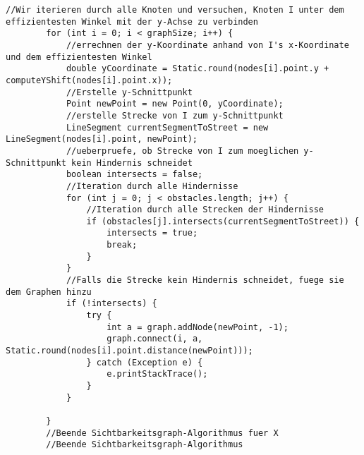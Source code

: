 \documentclass[a4paper,10pt,ngerman]{scrartcl}
\begin{document}
\begin{lstlisting}[frame=single]
        //Wir iterieren durch alle Knoten und versuchen, Knoten I unter dem effizientesten Winkel mit der y-Achse zu verbinden
        for (int i = 0; i < graphSize; i++) {
            //errechnen der y-Koordinate anhand von I's x-Koordinate und dem effizientesten Winkel
            double yCoordinate = Static.round(nodes[i].point.y + computeYShift(nodes[i].point.x));
            //Erstelle y-Schnittpunkt
            Point newPoint = new Point(0, yCoordinate);
            //erstelle Strecke von I zum y-Schnittpunkt
            LineSegment currentSegmentToStreet = new LineSegment(nodes[i].point, newPoint);
            //ueberpruefe, ob Strecke von I zum moeglichen y-Schnittpunkt kein Hindernis schneidet
            boolean intersects = false;
            //Iteration durch alle Hindernisse
            for (int j = 0; j < obstacles.length; j++) {
                //Iteration durch alle Strecken der Hindernisse
                if (obstacles[j].intersects(currentSegmentToStreet)) {
                    intersects = true;
                    break;
                }
            }
            //Falls die Strecke kein Hindernis schneidet, fuege sie dem Graphen hinzu
            if (!intersects) {
                try {
                    int a = graph.addNode(newPoint, -1);
                    graph.connect(i, a, Static.round(nodes[i].point.distance(newPoint)));
                } catch (Exception e) {
                    e.printStackTrace();
                }
            }

        }
        //Beende Sichtbarkeitsgraph-Algorithmus fuer X
        //Beende Sichtbarkeitsgraph-Algorithmus
        

\end{lstlisting}
\end{document}
